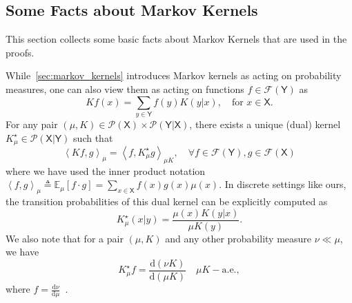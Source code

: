 \documentclass[conference,letterpaper]{IEEEtran}
\def \X{\mathsf X}
\def \Y{\mathsf Y}
\def \F{\mathcal F}
\def \calP{\mathcal P}
\def \dualK{K^\star_\mu}
\newcommand{\dd}[1]{\mathrm{d}#1}
\newcommand{\mean}[2]{\mathbb{E}_{#1}\left[#2\right]}
\newcommand{\ip}[2]{\left\langle#1, #2\right\rangle}
\begin{document}
\subsection{Some Facts about Markov Kernels}\noindent
    This section collects some basic facts about Markov Kernels that are used in the proofs.

    While~\cref{sec:markov_kernels} introduces Markov kernels as acting on probability measures, one can also view them as acting on functions $f\in\F(\Y)$ as
    \begin{equation*}
        Kf(x) = \sum_{y\in\Y} f(y)K(y|x), \quad \text{for }x\in\X.
    \end{equation*}
    For any pair $(\mu, K)\in\calP(\X)\times\calP(\Y|\X)$, there exists a unique (dual) kernel $\dualK\in\calP(\X|\Y)$ such that
    \begin{equation*}
        \ip{Kf}{g}_{\mu} = \ip{f}{\dualK g}_{\mu K}, \quad\forall f\in\F(\Y), g\in\F(\X) 
    \end{equation*}
    where we have used the inner product notation ${\ip{f}{g}_\mu\triangleq \mean{\mu}{f\cdot g}=\sum_{x\in\X}f(x)g(x)\mu(x)}$. In discrete settings like ours, the transition probabilities of this dual kernel can be explicitly computed as
    \begin{equation*}
        \dualK(x|y) = \frac{\mu(x)K(y|x)}{\mu K (y)}.
    \end{equation*}
    We also note that for a pair $(\mu, K)$ and any other probability measure $\nu\ll\mu$, we have
    \begin{equation}\label{eq:dual_kernel_formula}
        \dualK f = \frac{\dd(\nu K)}{\dd(\mu K)}\quad \mu K-\text{a.e.},
    \end{equation}
    where $f=\frac{\dd\nu}{\dd\mu}$~\cite[Lemma 1]{esposito2024contraction}.
\end{document}
